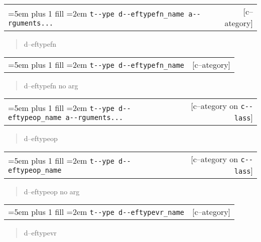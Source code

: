 \documentclass{book}
\begin{document}
\begin{titlepage}
\noindent\begin{tabularx}{\linewidth}{@{}Xr}
\rightskip=5em plus 1 fill
\hangindent=2em
\texttt{t{-}{-}ype d{-}{-}eftypefn\_name a{-}{-}rguments...}& [c--ategory]
\end{tabularx}

%
\begin{quote}
\unskip{\parskip=0pt\noindent}%
d--eftypefn
\end{quote}


\noindent\begin{tabularx}{\linewidth}{@{}Xr}
\rightskip=5em plus 1 fill
\hangindent=2em
\texttt{t{-}{-}ype d{-}{-}eftypefn\_name}& [c--ategory]
\end{tabularx}

%
\begin{quote}
\unskip{\parskip=0pt\noindent}%
d--eftypefn no arg
\end{quote}


\noindent\begin{tabularx}{\linewidth}{@{}Xr}
\rightskip=5em plus 1 fill
\hangindent=2em
\texttt{t{-}{-}ype d{-}{-}eftypeop\_name a{-}{-}rguments...}& [c--ategory on \texttt{c{-}{-}lass}]
\end{tabularx}

%
\begin{quote}
\unskip{\parskip=0pt\noindent}%
d--eftypeop
\end{quote}


\noindent\begin{tabularx}{\linewidth}{@{}Xr}
\rightskip=5em plus 1 fill
\hangindent=2em
\texttt{t{-}{-}ype d{-}{-}eftypeop\_name}& [c--ategory on \texttt{c{-}{-}lass}]
\end{tabularx}

%
\begin{quote}
\unskip{\parskip=0pt\noindent}%
d--eftypeop no arg
\end{quote}


\noindent\begin{tabularx}{\linewidth}{@{}Xr}
\rightskip=5em plus 1 fill
\hangindent=2em
\texttt{t{-}{-}ype d{-}{-}eftypevr\_name}& [c--ategory]
\end{tabularx}

%
\begin{quote}
\unskip{\parskip=0pt\noindent}%
d--eftypevr
\end{quote}



\end{titlepage}
\end{document}
